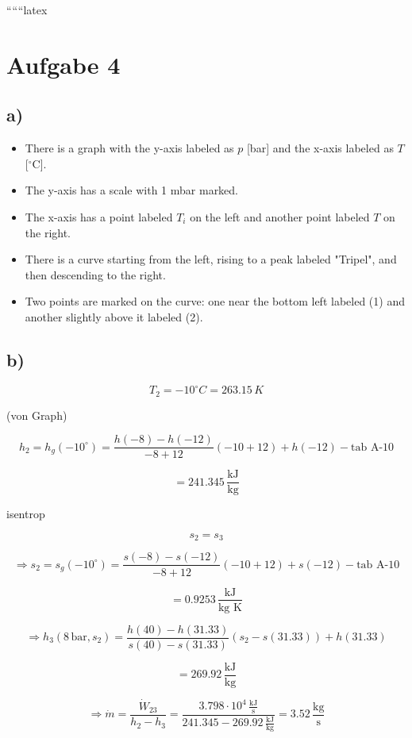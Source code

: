 
``````latex


\section*{Aufgabe 4}

\subsection*{a)}

\begin{itemize}
    \item There is a graph with the y-axis labeled as $p$ [bar] and the x-axis labeled as $T$ [$^\circ$C].
    \item The y-axis has a scale with 1 mbar marked.
    \item The x-axis has a point labeled $T_i$ on the left and another point labeled $T$ on the right.
    \item There is a curve starting from the left, rising to a peak labeled "Tripel", and then descending to the right.
    \item Two points are marked on the curve: one near the bottom left labeled (1) and another slightly above it labeled (2).
\end{itemize}

\subsection*{b)}

\[
T_2 = -10^\circ C = 263.15 \, K
\]

(von Graph)

\[
h_2 = h_g(-10^\circ) = \frac{h(-8) - h(-12)}{-8 + 12} (-10 + 12) + h(-12) - \text{tab A-10}
\]

\[
= 241.345 \, \frac{\text{kJ}}{\text{kg}}
\]

isentrop

\[
s_2 = s_3
\]

\[
\Rightarrow s_2 = s_g(-10^\circ) = \frac{s(-8) - s(-12)}{-8 + 12} (-10 + 12) + s(-12) - \text{tab A-10}
\]

\[
= 0.9253 \, \frac{\text{kJ}}{\text{kg K}}
\]

\[
\Rightarrow h_3 (8 \, \text{bar}, s_2) = \frac{h(40) - h(31.33)}{s(40) - s(31.33)} (s_2 - s(31.33)) + h(31.33)
\]

\[
= 269.92 \, \frac{\text{kJ}}{\text{kg}}
\]

\[
\Rightarrow \dot{m} = \frac{\dot{W}_{23}}{h_2 - h_3} = \frac{3.798 \cdot 10^4 \, \frac{\text{kJ}}{\text{s}}}{241.345 - 269.92 \, \frac{\text{kJ}}{\text{kg}}} = 3.52 \, \frac{\text{kg}}{\text{s}}
\]

